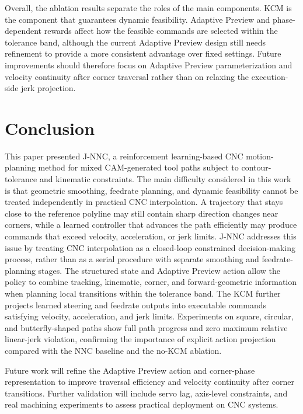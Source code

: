 \documentclass[preprint,12pt]{elsarticle}
\begin{document}
Overall, the ablation results separate the roles of the main components. KCM is the component that guarantees dynamic feasibility. Adaptive Preview and phase-dependent rewards affect how the feasible commands are selected within the tolerance band, although the current Adaptive Preview design still needs refinement to provide a more consistent advantage over fixed settings. Future improvements should therefore focus on Adaptive Preview parameterization and velocity continuity after corner traversal rather than on relaxing the execution-side jerk projection.

\section{Conclusion}
\label{sec:conclusion}

This paper presented J-NNC, a reinforcement learning-based CNC motion-planning method for mixed CAM-generated tool paths subject to contour-tolerance and kinematic constraints. The main difficulty considered in this work is that geometric smoothing, feedrate planning, and dynamic feasibility cannot be treated independently in practical CNC interpolation. A trajectory that stays close to the reference polyline may still contain sharp direction changes near corners, while a learned controller that advances the path efficiently may produce commands that exceed velocity, acceleration, or jerk limits. J-NNC addresses this issue by treating CNC interpolation as a closed-loop constrained decision-making process, rather than as a serial procedure with separate smoothing and feedrate-planning stages. The structured state and Adaptive Preview action allow the policy to combine tracking, kinematic, corner, and forward-geometric information when planning local transitions within the tolerance band. The KCM further projects learned steering and feedrate outputs into executable commands satisfying velocity, acceleration, and jerk limits. Experiments on square, circular, and butterfly-shaped paths show full path progress and zero maximum relative linear-jerk violation, confirming the importance of explicit action projection compared with the NNC baseline and the no-KCM ablation.

Future work will refine the Adaptive Preview action and corner-phase representation to improve traversal efficiency and velocity continuity after corner transitions. Further validation will include servo lag, axis-level constraints, and real machining experiments to assess practical deployment on CNC systems.

\clearpage


\end{document}

